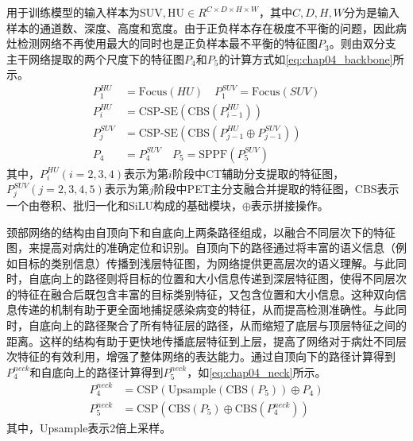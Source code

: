 用于训练模型的输入样本为\(\text{SUV}, \text{HU} \in R^{C \times D \times H \times W}\)，其中\(C,D,H,W\)分为是输入样本的通道数、深度、高度和宽度。由于正负样本存在极度不平衡的问题，因此病灶检测网络不再使用最大的同时也是正负样本最不平衡的特征图\(P_3\)。则由双分支主干网络提取的两个尺度下的特征图\(P_4\)和\(P_5\)的计算方式如\ref{eq:chap04_backbone}所示。
\begin{equation}
    \begin{aligned}
        P_1^{HU}  & = \text{Focus}(HU) \quad P_1^{SUV} = \text{Focus}(SUV)         \\
        P_i^{HU}  & = \text{CSP-SE}(\text{CBS}(P^{HU}_{i-1}))                      \\
        P_j^{SUV} & = \text{CSP-SE}(\text{CBS}(P^{HU}_{j-1} \oplus P^{SUV}_{j-1})) \\
        P_4       & = P_4^{SUV} \quad P_5 = \text{SPPF}(P_5^{SUV})
    \end{aligned}
    \label{eq:chap04_backbone}
\end{equation}
其中，\(P_i^{HU}(i=2,3,4)\)表示为第\(i\)阶段中CT辅助分支提取的特征图，\(P_j^{SUV}(j=2,3,4,5)\)表示为第\(j\)阶段中PET主分支融合并提取的特征图，CBS表示一个由卷积、批归一化和SiLU构成的基础模块，\(\oplus\)表示拼接操作。

颈部网络的结构由自顶向下和自底向上两条路径组成，以融合不同层次下的特征图，来提高对病灶的准确定位和识别。自顶向下的路径通过将丰富的语义信息（例如目标的类别信息）传播到浅层特征图，为网络提供更高层次的语义理解。与此同时，自底向上的路径则将目标的位置和大小信息传递到深层特征图，使得不同层次的特征在融合后既包含丰富的目标类别特征，又包含位置和大小信息。这种双向信息传递的机制有助于更全面地捕捉感染病变的特征，从而提高检测准确性。与此同时，自底向上的路径聚合了所有特征层的路径，从而缩短了底层与顶层特征之间的距离。这样的结构有助于更快地传播底层特征到上层，提高了网络对于病灶不同层次特征的有效利用，增强了整体网络的表达能力。通过自顶向下的路径计算得到\(P_4^{neck}\)和自底向上的路径计算得到\(P_5^{neck}\)，如\ref{eq:chap04_neck}所示。
\begin{equation}
    \begin{aligned}
        P_4^{neck} & = \text{CSP}(\text{Upsample}(\text{CBS}(P_5)) \oplus P_4)    \\
        P_5^{neck} & =  \text{CSP}(\text{CBS}(P_5) \oplus \text{CBS}(P_4^{neck}))
    \end{aligned}
    \label{eq:chap04_neck}
\end{equation}
其中，Upsample表示2倍上采样。


